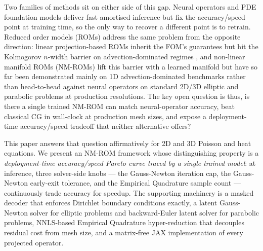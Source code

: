 \documentclass{article}
\begin{document}
Two families of methods sit on either side of this gap. Neural
operators and PDE foundation models
\citep{HerdePoseidon2024,McCabeMPP2024,HaoDPOT2024,Chen2024UnsupervisedNO} deliver fast
amortised inference but fix the accuracy/speed point at training time,
so the only way to recover a different point is to retrain. Reduced order
models (ROMs) address the same problem from the opposite direction: linear                       
projection-based ROMs \citep{BennerGugercinWillcox2015,Sirovich1987POD}                   
inherit the FOM's guarantees but hit the Kolmogorov $n$-width barrier                     
on advection-dominated regimes \citep{CohenDeVore2015}, and non-linear                    
manifold ROMs (NM-ROMs) \citep{LeeCarlberg2020,KimChoi2022NMROM} lift                     
this barrier with a learned manifold but have so far been demonstrated                    
mainly on 1D advection-dominated benchmarks rather than head-to-head                      
against neural operators on standard 2D/3D elliptic and parabolic                         
problems at production resolutions. The key open question is thus, is there a                        
single trained NM-ROM can match neural-operator accuracy, beat                            
classical CG in wall-clock at production mesh sizes, and expose a                         
deployment-time accuracy/speed tradeoff that neither alternative offers?                                                                                                                  

This paper answers that question affirmatively for 2D and 3D Poisson
and heat equations. We present an NM-ROM framework whose distinguishing                 
property is a \emph{deployment-time accuracy/speed Pareto curve traced                  
by a single trained model}: at inference, three solver-side knobs ---                   
the Gauss-Newton iteration cap, the Gauss-Newton early-exit tolerance,                  
and the Empirical Quadrature sample count --- continuously trade                        
accuracy for speedup. The supporting machinery is a masked decoder                     
that enforces Dirichlet boundary conditions exactly, a latent                           
Gauss-Newton solver \citep{NocedalWright2006} for elliptic problems and                   
backward-Euler latent solver for parabolic problems, NNLS-based                         
Empirical Quadrature hyper-reduction                                                    \citep{Hernandez2017EQ,YanoPatera2019LPEQ,LawsonHanson1974NNLS} that                    
decouples residual cost from mesh size, and a matrix-free JAX                           
implementation \citep{Bradbury2018JAX} of every projected operator.
\end{document}
